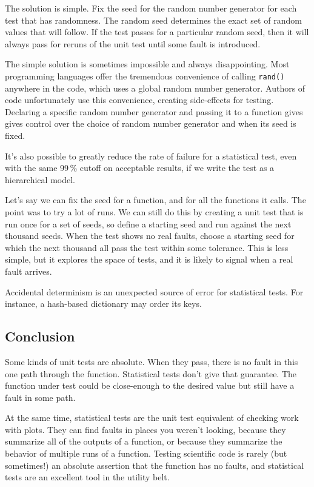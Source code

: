 \documentclass[fleqn,10pt]{olplainarticle}
\begin{document}
The solution is simple. Fix the seed for the random number
generator for each test that has randomness. The random
seed determines the exact set of random values that will
follow. If the test passes for a particular random seed,
then it will always pass for reruns of the unit test until
some fault is introduced.

The simple solution is sometimes impossible and always
disappointing. Most programming languages offer the tremendous
convenience of calling \lstinline!rand()! anywhere in the
code, which uses a global random number generator. Authors
of code unfortunately use this convenience, creating side-effects
for testing. Declaring a specific random number generator
and passing it to a function gives gives control over the
choice of random number generator and when its seed is fixed.

It's also possible to greatly reduce the rate of failure
for a statistical test, even with the same 99\,\% cutoff
on acceptable results, if we write the test as a hierarchical
model.

Let's say we can fix the seed for a function, and for all the
functions it calls. The point was to try a lot of runs. We
can still do this by creating a unit test that is run once
for a set of seeds, so define a starting seed and run against
the next thousand seeds. When the test shows no real faults,
choose a starting seed for which the next thousand all pass
the test within some tolerance. This is less simple, but it
explores the space of tests, and it is likely to signal when
a real fault arrives.

Accidental determinism is an unexpected source of error for
statistical tests. For instance, a hash-based dictionary may
order its keys.

\subsection{Conclusion}

Some kinds of unit tests are absolute. When they pass,
there is no fault in this one path through the function.
Statistical tests don't give that guarantee. The function
under test could be close-enough to the desired value but
still have a fault in some path.

At the same time, statistical tests are the unit test
equivalent of checking work with plots. They can find faults
in places you weren't looking, because they summarize all
of the outputs of a function, or because they summarize
the behavior of multiple runs of a function. Testing scientific
code is rarely (but sometimes!) an absolute assertion that
the function has no faults, and statistical tests are an
excellent tool in the utility belt.
\end{document}
